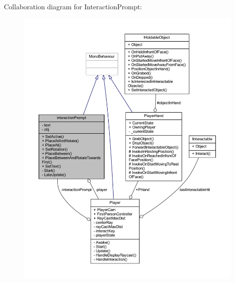 Collaboration diagram for Interaction\+Prompt\+:
\nopagebreak
\begin{figure}[H]
\begin{center}
\leavevmode
\includegraphics[width=350pt]{class_interaction_prompt__coll__graph}
\end{center}
\end{figure}
